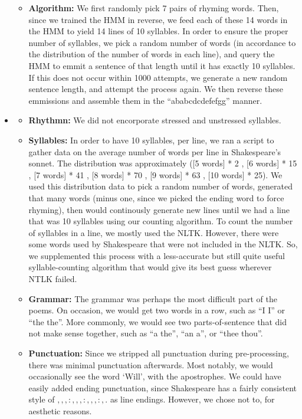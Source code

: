 \begin{itemize}
\begin{itemize}
    \item \textbf{Algorithm:}
        We first randomly pick 7 pairs of rhyming words. Then, since we trained
        the HMM in reverse, we feed each of these 14 words in the HMM to yield
        14 lines of 10 syllables. In order to ensure the proper number of
        syllables, we pick a random number of words (in accordance to the
        distribution of the number of words in each line), and query the HMM
        to emmit a sentence of that length until it has exactly 10 syllables.
        If this does not occur within 1000 attempts, we generate a new
        random sentence length, and attempt the process again. We then
        reverse these emmissions and assemble them in the ``ababcdcdefefgg''
        manner.


    \end{itemize}

    \item {}
    \begin{itemize}
        \item \textbf{Rhythmn:} We did not encorporate stressed and unstressed
            syllables.
        \item \textbf{Syllables:} In order to have 10 syllables, per line, we ran a script to gather data on the average number of words per line in Shakespeare's sonnet. The distribution was approximately ([5 words] * 2 , [6 words] * 15 , [7 words] * 41 , [8 words] * 70 , [9 words] * 63 , [10 words] * 25). We used this distribution data to pick a random number of words, generated that many words (minus one, since we picked the ending word to force rhyming), then would continously generate new lines until we had a line that was 10 syllables using our counting algorithm.
        To count the number of syllables in a line, we mostly used the NLTK. However, there were some words used by Shakespeare that were not included in the NLTK. So, we supplemented this process with a less-accurate but still quite useful syllable-counting algorithm that would give its best guess wherever NTLK failed.
        \item \textbf{Grammar:} The grammar was perhaps the most difficult part of the poems. On occasion, we would get two words in a row, such as ``I I'' or ``the the''. More commonly, we would see two parts-of-sentence that did not make sense together, such as ``a the'', ``an a'', or ``thee thou''.
        \item \textbf{Punctuation:} Since we stripped all punctuation during pre-processing, there was minimal punctuation afterwards. Most notably, we would occasionally see the word `Will', with the apostrophes. We could have easily added ending punctuation, since Shakespeare has a fairly consistent style of $,,,:,,,:,,,:,.$ as line endings. However, we chose not to, for aesthetic reasons.
    \end{itemize}

\end{itemize}

